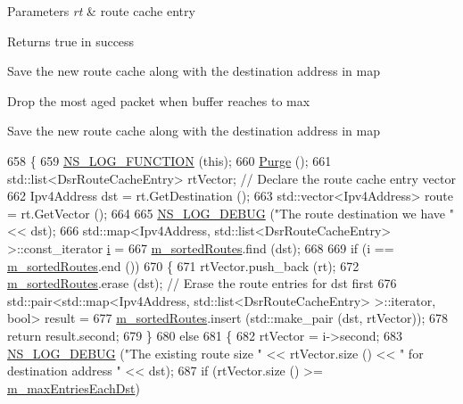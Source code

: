 \begin{DoxyParams}{Parameters}
{\em rt} & route cache entry \\
\hline
\end{DoxyParams}
\begin{DoxyReturn}{Returns}
true in success 
\end{DoxyReturn}
Save the new route cache along with the destination address in map

Drop the most aged packet when buffer reaches to max

Save the new route cache along with the destination address in map
\begin{DoxyCode}
658 \{
659   \hyperlink{log-macros-disabled_8h_a90b90d5bad1f39cb1b64923ea94c0761}{NS\_LOG\_FUNCTION} (\textcolor{keyword}{this});
660   \hyperlink{classns3_1_1dsr_1_1DsrRouteCache_a33ac58361cc0e1cbe1b561db26f5dc82}{Purge} ();
661   std::list<DsrRouteCacheEntry> rtVector;   \textcolor{comment}{// Declare the route cache entry vector}
662   Ipv4Address dst = rt.GetDestination ();
663   std::vector<Ipv4Address> route = rt.GetVector ();
664 
665   \hyperlink{group__logging_ga413f1886406d49f59a6a0a89b77b4d0a}{NS\_LOG\_DEBUG} (\textcolor{stringliteral}{"The route destination we have "} << dst);
666   std::map<Ipv4Address, std::list<DsrRouteCacheEntry> >::const\_iterator \hyperlink{bernuolliDistribution_8m_a6f6ccfcf58b31cb6412107d9d5281426}{i} =
667     \hyperlink{classns3_1_1dsr_1_1DsrRouteCache_a8d3530713c7152dbe42d0b616d9c1d96}{m\_sortedRoutes}.find (dst);
668 
669   \textcolor{keywordflow}{if} (i == \hyperlink{classns3_1_1dsr_1_1DsrRouteCache_a8d3530713c7152dbe42d0b616d9c1d96}{m\_sortedRoutes}.end ())
670     \{
671       rtVector.push\_back (rt);
672       \hyperlink{classns3_1_1dsr_1_1DsrRouteCache_a8d3530713c7152dbe42d0b616d9c1d96}{m\_sortedRoutes}.erase (dst);   \textcolor{comment}{// Erase the route entries for dst first}
676 \textcolor{comment}{}      std::pair<std::map<Ipv4Address, std::list<DsrRouteCacheEntry> >::iterator, \textcolor{keywordtype}{bool}> result =
677         \hyperlink{classns3_1_1dsr_1_1DsrRouteCache_a8d3530713c7152dbe42d0b616d9c1d96}{m\_sortedRoutes}.insert (std::make\_pair (dst, rtVector));
678       \textcolor{keywordflow}{return} result.second;
679     \}
680   \textcolor{keywordflow}{else}
681     \{
682       rtVector = i->second;
683       \hyperlink{group__logging_ga413f1886406d49f59a6a0a89b77b4d0a}{NS\_LOG\_DEBUG} (\textcolor{stringliteral}{"The existing route size "} << rtVector.size () << \textcolor{stringliteral}{" for destination address
       "} << dst);
687       \textcolor{keywordflow}{if} (rtVector.size () >= \hyperlink{classns3_1_1dsr_1_1DsrRouteCache_aa6b2bd241ac25da54f0ee83d6a9946be}{m\_maxEntriesEachDst})

\end{DoxyCode}
